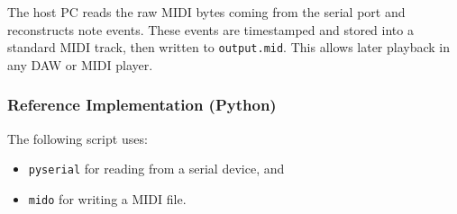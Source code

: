 \documentclass[12pt]{article}
\begin{document}
The host PC reads the raw MIDI bytes coming from the serial port and reconstructs note events. These events are timestamped and stored into a standard MIDI track, then written to \texttt{output.mid}. This allows later playback in any DAW or MIDI player.

\subsubsection{Reference Implementation (Python)}

The following script uses:
\begin{itemize}
    \item \texttt{pyserial} for reading from a serial device, and
    \item \texttt{mido} for writing a MIDI file.
\end{itemize}
\end{document}
